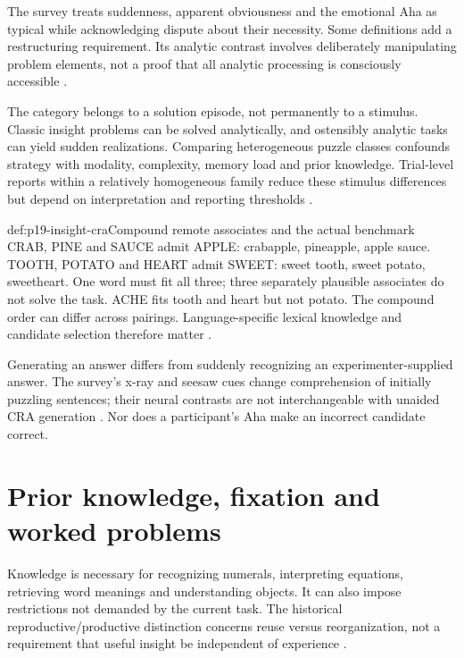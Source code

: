 The survey treats suddenness, apparent obviousness and the emotional Aha
as typical while acknowledging dispute about their necessity.
Some definitions add a restructuring requirement. Its analytic contrast
involves deliberately manipulating problem elements, not a proof that
all analytic processing is consciously accessible
\parencite[pp.~475--479]{VanSteenburghEtAl2012InsightRevises}.

The category belongs to a solution episode, not permanently to a stimulus.
Classic insight problems can be solved analytically, and ostensibly
analytic tasks can yield sudden realizations. Comparing heterogeneous
puzzle classes confounds strategy with modality, complexity, memory
load and prior knowledge. Trial-level reports within a relatively
homogeneous family reduce these stimulus differences but depend on
interpretation and reporting thresholds
\parencite[pp.~486--488]{VanSteenburghEtAl2012InsightRevises}.

\begin{hbexample}{def:p19-insight-cra}{Compound remote associates and the actual benchmark}
CRAB, PINE and SAUCE admit APPLE: crabapple, pineapple, apple sauce.
TOOTH, POTATO and HEART admit SWEET: sweet tooth, sweet potato, sweetheart.
One word must fit all three; three separately plausible associates do not
solve the task. ACHE fits tooth and heart but not potato.
The compound order can differ across pairings.
Language-specific lexical knowledge and candidate selection therefore matter
\parencite[pp.~501, 507--508]{JungBeemanEtAl2004NeuralInsight}
\parencite[pp.~418--419]{SubramaniamEtAl2009PositiveAffect}.
\end{hbexample}

Generating an answer differs from suddenly recognizing an experimenter-supplied
answer. The survey's x-ray and seesaw cues change comprehension of initially
puzzling sentences; their neural contrasts are not interchangeable with
unaided CRA generation \parencite[pp.~482, 488]{VanSteenburghEtAl2012InsightRevises}.
Nor does a participant's Aha make an incorrect candidate correct.

\section{Prior knowledge, fixation and worked problems}
\label{sec:p19-insight-knowledge}

Knowledge is necessary for recognizing numerals, interpreting equations,
retrieving word meanings and understanding objects. It can also impose
restrictions not demanded by the current task. The historical
reproductive/productive distinction concerns reuse versus reorganization,
not a requirement that useful insight be independent of experience
\parencite[pp.~479--481]{VanSteenburghEtAl2012InsightRevises}.

